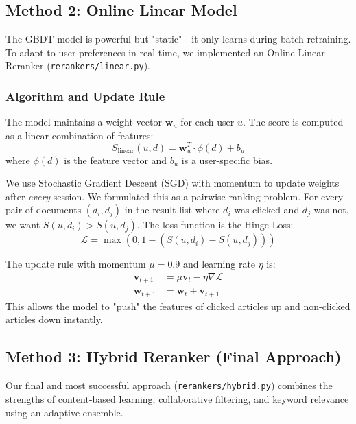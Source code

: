 \documentclass[11pt,a4paper]{article}
\begin{document}
\subsection{Method 2: Online Linear Model}
The GBDT model is powerful but "static"—it only learns during batch retraining. To adapt to user preferences in real-time, we implemented an Online Linear Reranker (\texttt{rerankers/linear.py}).

\subsubsection{Algorithm and Update Rule}
The model maintains a weight vector $\mathbf{w}_u$ for each user $u$. The score is computed as a linear combination of features:
$$ S_{\text{linear}}(u, d) = \mathbf{w}_u^T \cdot \phi(d) + b_u $$
where $\phi(d)$ is the feature vector and $b_u$ is a user-specific bias.

We use Stochastic Gradient Descent (SGD) with momentum to update weights after \textit{every} session. We formulated this as a pairwise ranking problem. For every pair of documents $(d_i, d_j)$ in the result list where $d_i$ was clicked and $d_j$ was not, we want $S(u, d_i) > S(u, d_j)$. The loss function is the Hinge Loss:
$$ \mathcal{L} = \max(0, 1 - (S(u, d_i) - S(u, d_j))) $$

The update rule with momentum $\mu=0.9$ and learning rate $\eta$ is:
\begin{align*}
\mathbf{v}_{t+1} &= \mu \mathbf{v}_t - \eta \nabla \mathcal{L} \\
\mathbf{w}_{t+1} &= \mathbf{w}_t + \mathbf{v}_{t+1}
\end{align*}
This allows the model to "push" the features of clicked articles up and non-clicked articles down instantly.

\subsection{Method 3: Hybrid Reranker (Final Approach)}
Our final and most successful approach (\texttt{rerankers/hybrid.py}) combines the strengths of content-based learning, collaborative filtering, and keyword relevance using an adaptive ensemble.
\end{document}
